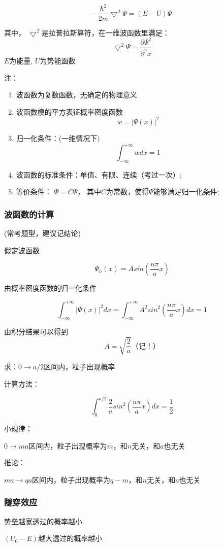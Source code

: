 \documentclass{ctexart}
\begin{document}
$$-\frac{\hbar^2}{2m}\bigtriangledown ^2\Psi=(E-U)\Psi$$

其中，
$\bigtriangledown ^2$是拉普拉斯算符，在一维波函数里满足：
$$\bigtriangledown ^2\Psi=\frac{\partial \Psi^2}{\partial^2 x}$$
$E$为能量,
$U$为势能函数

注：\begin{enumerate}
	\item 波函数为复数函数，无确定的物理意义
	\item 波函数模的平方表征概率密度函数
	$$w=|\Psi (x)|^2$$
	\item 归一化条件：(一维情况下)
	$$\int_{-\infty}^{+\infty} wdx=1$$
	\item 波函数的标准条件：单值、有限、连续（考过一次）;
	\item 等价条件：
	$\Psi  = C\Psi$，
	其中$C$为常数，使得$\Psi$能够满足归一化条件;
\end{enumerate}

\subsubsection{波函数的计算}

(常考题型，建议记结论)

假定波函数

$$\Psi_n(x)=Asin(\frac{n\pi}{a}x)$$

由概率密度函数的归一化条件

$$\int_{-\infty}^{+\infty} |\Psi(x)|^2dx=\int_{-\infty}^{+\infty} A^2sin^2(\frac{n\pi}{a}x)dx=1$$
    
由积分结果可以得到$$A=\sqrt{\frac{2}{a}}\text{（记！）}$$

求：$0\rightarrow a/2$区间内，粒子出现概率

计算方法：

$$\int_{0}^{a/2} \frac{2}{a}sin^2(\frac{n\pi}{a}x)dx=\frac{1}{2}$$

小规律：

$0\rightarrow ma$区间内，粒子出现概率为$m$，和$n$无关，和$a$也无关

推论：

$ma\rightarrow qa$区间内，粒子出现概率为$q-m$，和$n$无关，和$a$也无关

\subsubsection{隧穿效应}

势垒越宽透过的概率越小

$(U_0-E)$越大透过的概率越小
\end{document}

